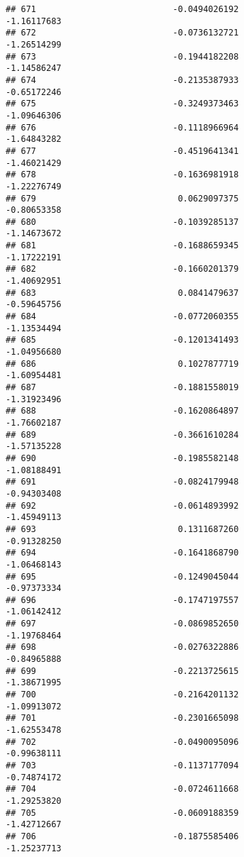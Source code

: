 \documentclass[
]{article}
\begin{document}
\begin{verbatim}
## 671                           -0.0494026192                -1.16117683
## 672                           -0.0736132721                -1.26514299
## 673                           -0.1944182208                -1.14586247
## 674                           -0.2135387933                -0.65172246
## 675                           -0.3249373463                -1.09646306
## 676                           -0.1118966964                -1.64843282
## 677                           -0.4519641341                -1.46021429
## 678                           -0.1636981918                -1.22276749
## 679                            0.0629097375                -0.80653358
## 680                           -0.1039285137                -1.14673672
## 681                           -0.1688659345                -1.17222191
## 682                           -0.1660201379                -1.40692951
## 683                            0.0841479637                -0.59645756
## 684                           -0.0772060355                -1.13534494
## 685                           -0.1201341493                -1.04956680
## 686                            0.1027877719                -1.60954481
## 687                           -0.1881558019                -1.31923496
## 688                           -0.1620864897                -1.76602187
## 689                           -0.3661610284                -1.57135228
## 690                           -0.1985582148                -1.08188491
## 691                           -0.0824179948                -0.94303408
## 692                           -0.0614893992                -1.45949113
## 693                            0.1311687260                -0.91328250
## 694                           -0.1641868790                -1.06468143
## 695                           -0.1249045044                -0.97373334
## 696                           -0.1747197557                -1.06142412
## 697                           -0.0869852650                -1.19768464
## 698                           -0.0276322886                -0.84965888
## 699                           -0.2213725615                -1.38671995
## 700                           -0.2164201132                -1.09913072
## 701                           -0.2301665098                -1.62553478
## 702                           -0.0490095096                -0.99638111
## 703                           -0.1137177094                -0.74874172
## 704                           -0.0724611668                -1.29253820
## 705                           -0.0609188359                -1.42712667
## 706                           -0.1875585406                -1.25237713

\end{verbatim}
\end{document}
